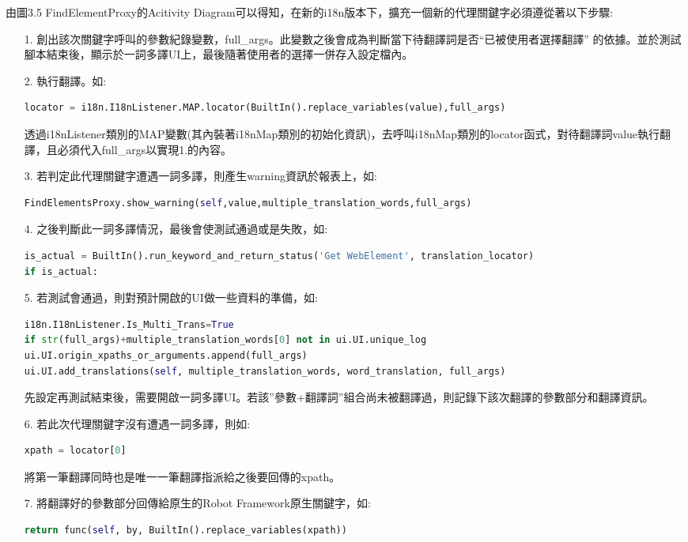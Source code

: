 由圖3.5 FindElementProxy的Acitivity Diagram可以得知，在新的i18n版本下，擴充一個新的代理關鍵字必須遵從著以下步驟:
\begin{itemize}
\item[1.]創出該次關鍵字呼叫的參數紀錄變數，full\_args。此變數之後會成為判斷當下待翻譯詞是否“已被使用者選擇翻譯” 的依據。並於測試腳本結束後，顯示於一詞多譯UI上，最後隨著使用者的選擇一併存入設定檔內。

\item[2.]執行翻譯。如:
\begin{lstlisting}[language={python}]
locator = i18n.I18nListener.MAP.locator(BuiltIn().replace_variables(value),full_args)
\end{lstlisting}
透過i18nListener類別的MAP變數(其內裝著i18nMap類別的初始化資訊)，去呼叫i18nMap類別的locator函式，對待翻譯詞value執行翻譯，且必須代入full\_args以實現1.的內容。

\item[3.]若判定此代理關鍵字遭遇一詞多譯，則產生warning資訊於報表上，如:
\begin{lstlisting}[language={python}]
FindElementsProxy.show_warning(self,value,multiple_translation_words,full_args)
\end{lstlisting}

\item[4.]之後判斷此一詞多譯情況，最後會使測試通過或是失敗，如:
\begin{lstlisting}[language={python}]
is_actual = BuiltIn().run_keyword_and_return_status('Get WebElement', translation_locator)
if is_actual:
\end{lstlisting}

\item[5.]若測試會通過，則對預計開啟的UI做一些資料的準備，如:
\begin{lstlisting}[language={python}]
i18n.I18nListener.Is_Multi_Trans=True
if str(full_args)+multiple_translation_words[0] not in ui.UI.unique_log
ui.UI.origin_xpaths_or_arguments.append(full_args)
ui.UI.add_translations(self, multiple_translation_words, word_translation, full_args)
\end{lstlisting}
先設定再測試結束後，需要開啟一詞多譯UI。若該”參數+翻譯詞”組合尚未被翻譯過，則記錄下該次翻譯的參數部分和翻譯資訊。

\item[6.]若此次代理關鍵字沒有遭遇一詞多譯，則如:
\begin{lstlisting}[language={python}]
xpath = locator[0]
\end{lstlisting}
將第一筆翻譯同時也是唯一一筆翻譯指派給之後要回傳的xpath。

\item[7.]將翻譯好的參數部分回傳給原生的Robot Framework原生關鍵字，如:
\begin{lstlisting}[language={python}]
return func(self, by, BuiltIn().replace_variables(xpath))
\end{lstlisting}
\end{itemize}

